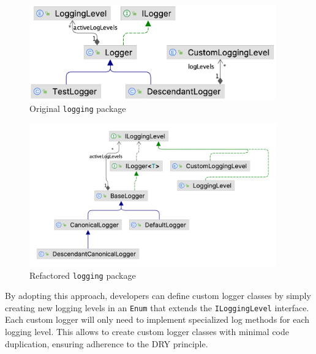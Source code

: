 \begin{minipage}{0.4\linewidth}
	\begin{figure}[H]
		\begin{center}
			\includegraphics[width=0.95\textwidth]{figures/logging_package/original.png}
			\caption{Original \texttt{logging} package}
			\label{fig:original-logging}
		\end{center}
	\end{figure}
\end{minipage}
\begin{minipage}{0.6\linewidth}
	\begin{figure}[H]
		\begin{center}
			\includegraphics[width=0.95\textwidth]{figures/logging_package/refactored.png}
			\caption{Refactored \texttt{logging} package}
			\label{fig:refactored-logging}
		\end{center}
	\end{figure}
\end{minipage}

\noindent By adopting this approach, developers can define custom logger classes by simply creating new logging levels in an \texttt{Enum} that extends the \texttt{ILoggingLevel} interface. Each custom logger will only need to implement specialized log methods for each logging level. This allows to create custom logger classes with minimal code duplication, ensuring adherence to the DRY principle.

